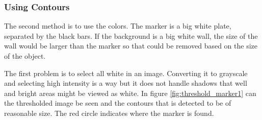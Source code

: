 \subsubsection{Using Contours}
The second method is to use the colors. The marker is a big white plate, separated by the black bars.
If the background is a big white wall, the size of the wall would be larger than the marker so that could be removed based on the size of the object.

The first problem is to select all white in an image.
Converting it to grayscale and selecting high intensity is a way but it does not handle shadows that well and bright areas might be viewed as white.
In figure \ref{fig:threshold_marker1} can the thresholded image be seen and the contours that is detected to be of reasonable size.
The red circle indicates where the marker is found.

